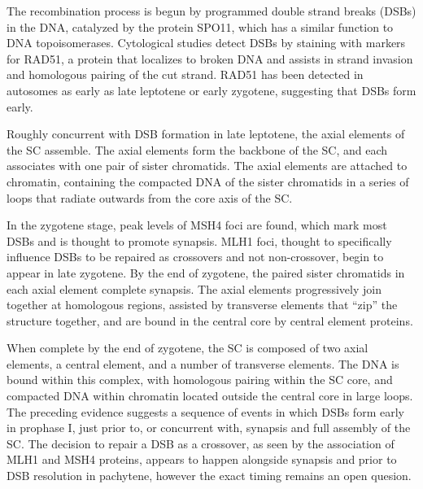 The recombination process is begun by programmed double strand breaks (DSBs) in the DNA, catalyzed by the protein SPO11, which has a similar function to DNA topoisomerases\cite{DeMassy2013}.
Cytological studies detect DSBs by staining with markers for RAD51, a protein that localizes to broken DNA and assists in strand invasion and homologous pairing of the cut strand.
RAD51 has been detected in autosomes as early as late leptotene or early zygotene\cite{Oliver-Bonet2005}, suggesting that DSBs form early.

Roughly concurrent with DSB formation in late leptotene, the axial elements of the SC assemble\cite{Yang2009}.
The axial elements form the backbone of the SC, and each associates with one pair of sister chromatids.
The axial elements are attached to chromatin, containing the compacted DNA of the sister chromatids in a series of loops that radiate outwards from the core axis of the SC.

In the zygotene stage, peak levels of MSH4 foci are found, which mark most DSBs and is thought to promote synapsis\cite{Oliver-Bonet2005}.
MLH1 foci, thought to specifically influence DSBs to be repaired as crossovers and not non-crossover\cite{Baker1996}, begin to appear in late zygotene\cite{Oliver-Bonet2005}.
By the end of zygotene, the paired sister chromatids in each axial element complete synapsis.
The axial elements progressively join together at homologous regions, assisted by transverse elements that ``zip'' the structure together, and are bound in the central core by central element proteins\cite{Yang2009}.

When complete by the end of zygotene, the SC is composed of two axial elements, a central element, and a number of transverse elements\cite{Yang2009}.
The DNA is bound within this complex, with homologous pairing within the SC core, and compacted DNA within chromatin located outside the central core in large loops.
The preceding evidence suggests a sequence of events in which DSBs form early in prophase I, just prior to, or concurrent with, synapsis and full assembly of the SC.
The decision to repair a DSB as a crossover, as seen by the association of MLH1 and MSH4 proteins, appears to happen alongside synapsis and prior to DSB resolution in pachytene, however the exact timing remains an open quesion\cite{Baudat2007}.

